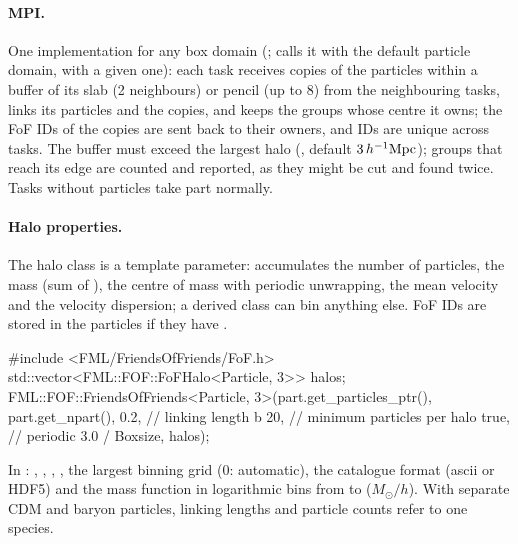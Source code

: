 \paragraph*{MPI.} One implementation for any box domain (;  calls it with the default
particle domain,  with a given one): each task receives copies of the particles within a buffer
of its slab (2 neighbours) or pencil (up to 8) from the neighbouring tasks, links its particles and the copies, and keeps the groups
whose centre it owns; the FoF IDs of the
copies are sent back to their owners, and IDs are unique across tasks. The buffer must exceed the largest halo
(, default $3\,h^{-1}\mathrm{Mpc}$); groups that reach its edge are counted and reported, as they might be cut and found
twice. Tasks without particles take part normally.

\paragraph*{Halo properties.} The halo class is a template parameter:  accumulates the number of particles, the mass (sum
of ), the centre of mass with periodic unwrapping, the mean velocity and the velocity dispersion; a derived class can bin
anything else. FoF IDs are stored in the particles if they have .

\begin{cppcode}
#include <FML/FriendsOfFriends/FoF.h>
std::vector<FML::FOF::FoFHalo<Particle, 3>> halos;
FML::FOF::FriendsOfFriends<Particle, 3>(part.get_particles_ptr(), part.get_npart(),
                                        0.2,      // linking length b
                                        20,       // minimum particles per halo
                                        true,     // periodic
                                        3.0 / Boxsize, halos);
\end{cppcode}

In : , , , , the
largest binning grid  (0: automatic), the catalogue format  (ascii or HDF5) and
the mass function in  logarithmic bins from  to 
($M_\odot/h$). With separate CDM and baryon particles, linking lengths and particle counts refer to one
species.

